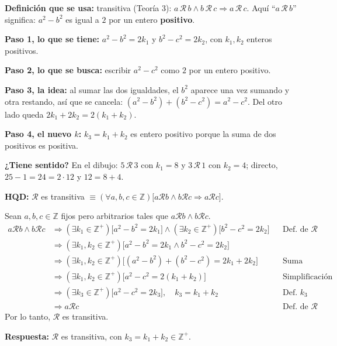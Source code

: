 \documentclass[11pt]{article}
\newcommand{\R}{\mathcal R}
\newcommand{\jus}[1]{&&\text{#1}}
\begin{document}

\begin{explica}
\textbf{Definición que se usa:} transitiva (Teoría 3): $a\,\R\,b\wedge b\,\R\,c\Rightarrow a\,\R\,c$. Aquí ``$a\,\R\,b$'' significa: $a^2-b^2$ es igual a $2$ por un entero \textbf{positivo}.

\textbf{Paso 1, lo que se tiene:} $a^2-b^2=2k_1$ y $b^2-c^2=2k_2$, con $k_1,k_2$ enteros positivos.

\textbf{Paso 2, lo que se busca:} escribir $a^2-c^2$ como $2$ por un entero positivo.

\textbf{Paso 3, la idea:} al sumar las dos igualdades, el $b^2$ aparece una vez sumando y otra restando, así que se cancela: $(a^2-b^2)+(b^2-c^2)=a^2-c^2$. Del otro lado queda $2k_1+2k_2=2(k_1+k_2)$.

\textbf{Paso 4, el nuevo $k$:} $k_3=k_1+k_2$ es entero positivo porque la suma de dos positivos es positiva.

\textbf{¿Tiene sentido?} En el dibujo: $5\,\R\,3$ con $k_1=8$ y $3\,\R\,1$ con $k_2=4$; directo, $25-1=24=2\cdot12$ y $12=8+4$.
\end{explica}

\textbf{HQD:} $\R$ es transitiva $\equiv(\forall a,b,c\in\mathbb Z)\big[a\R b\wedge b\R c\Rightarrow a\R c\big]$.

Sean $a,b,c\in\mathbb Z$ fijos pero arbitrarios tales que $a\R b\wedge b\R c$.
\begin{align*}
a\R b\wedge b\R c&\Rightarrow(\exists k_1\in\mathbb Z^+)\big[a^2-b^2=2k_1\big]\wedge(\exists k_2\in\mathbb Z^+)\big[b^2-c^2=2k_2\big]\jus{Def. de $\R$}\\
&\Rightarrow(\exists k_1,k_2\in\mathbb Z^+)\big[a^2-b^2=2k_1\wedge b^2-c^2=2k_2\big]\\
&\Rightarrow(\exists k_1,k_2\in\mathbb Z^+)\big[(a^2-b^2)+(b^2-c^2)=2k_1+2k_2\big]\jus{Suma término a término}\\
&\Rightarrow(\exists k_1,k_2\in\mathbb Z^+)\big[a^2-c^2=2(k_1+k_2)\big]\jus{Simplificación}\\
&\Rightarrow(\exists k_3\in\mathbb Z^+)\big[a^2-c^2=2k_3\big],\quad k_3=k_1+k_2\jus{Def. $k_3$}\\
&\Rightarrow a\R c\jus{Def. de $\R$}
\end{align*}
Por lo tanto, $\R$ es transitiva.

\textbf{Respuesta:} $\R$ es transitiva, con $k_3=k_1+k_2\in\mathbb Z^+$.
\end{document}
